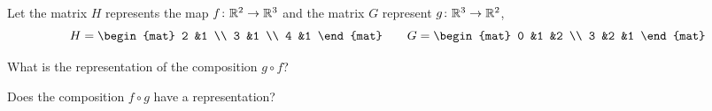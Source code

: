 \documentclass[11pt]{examjh}
\begin{document}
\begin{questions}
\question
Let the matrix $H$ represents the map $\mbox{$f\colon \mathbb{R}^2\to \mathbb{R}^3$}$
and the matrix $G$ represent $\mbox{$g\colon \mathbb{R}^3\to \mathbb{R}^2$}$,
\begin{equation*}
H=
\begin{mat}
2  &1  \\
3  &1  \\
4  &1
\end{mat}
\qquad
G=
\begin{mat}
0  &1 &2  \\
3  &2 &1  
\end{mat}
\end{equation*}
\begin{parts}
\item What is the representation of the composition $g\circ f$?
\begin{solution}[1.25in]

\end{solution}
\item Does the composition $f\circ g$ have a representation?
\begin{solution}[1.25in]

\end{solution}
\end{parts}

\end{questions}
\end{document}
